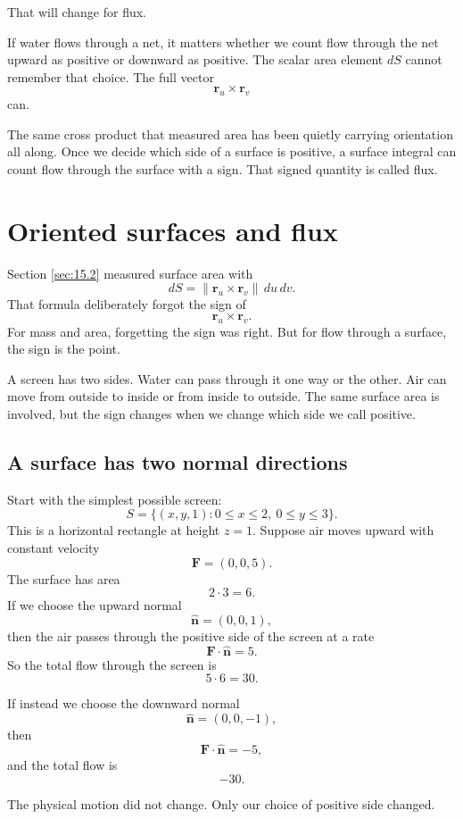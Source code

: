 That will change for flux.

If water flows through a net, it matters whether we count flow through the net upward
as positive or downward as positive.  The scalar area element \(dS\) cannot remember
that choice.  The full vector
\[
    \mathbf r_u\times\mathbf r_v
\]
can.

The same cross product that measured area has been quietly carrying orientation all
along.  Once we decide which side of a surface is positive, a surface integral can count
flow through the surface with a sign.  That signed quantity is called flux.
\section{Oriented surfaces and flux}
\label{sec:15.3}

Section \ref{sec:15.2} measured surface area with
\[
    dS=\|\mathbf r_u\times\mathbf r_v\|\,du\,dv.
\]
That formula deliberately forgot the sign of
\[
    \mathbf r_u\times\mathbf r_v.
\]
For mass and area, forgetting the sign was right.  But for flow through a surface, the
sign is the point.

A screen has two sides.  Water can pass through it one way or the other.  Air can move
from outside to inside or from inside to outside.  The same surface area is involved,
but the sign changes when we change which side we call positive.

\subsection{A surface has two normal directions}

Start with the simplest possible screen:
\[
    S=\{(x,y,1):0\le x\le2,\ 0\le y\le3\}.
\]
This is a horizontal rectangle at height \(z=1\).  Suppose air moves upward with
constant velocity
\[
    \mathbf F=(0,0,5).
\]
The surface has area
\[
    2\cdot3=6.
\]
If we choose the upward normal
\[
    \widehat{\mathbf n}=(0,0,1),
\]
then the air passes through the positive side of the screen at a rate
\[
    \mathbf F\cdot\widehat{\mathbf n}=5.
\]
So the total flow through the screen is
\[
    5\cdot6=30.
\]

If instead we choose the downward normal
\[
    \widehat{\mathbf n}=(0,0,-1),
\]
then
\[
    \mathbf F\cdot\widehat{\mathbf n}=-5,
\]
and the total flow is
\[
    -30.
\]

The physical motion did not change.  Only our choice of positive side changed.

